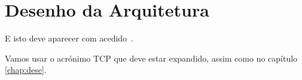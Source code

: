 \chapter{Desenho da Arquitetura}\label{chap:syst}
E isto deve aparecer com acedido~\cite{urlLinkTest}.

Vamos usar o acrónimo \ac{TCP} que deve estar expandido, assim como no capítulo \ref{chap:dese}.

\lipsum


